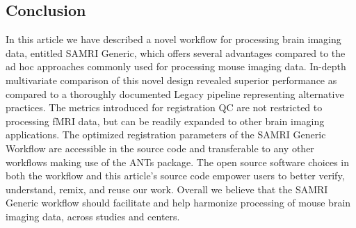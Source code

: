 \subsection{Conclusion}


In this article we have described a novel workflow for processing brain imaging data, entitled SAMRI Generic, which offers several advantages compared to the ad hoc approaches commonly used for processing mouse imaging data.
In-depth multivariate comparison of this novel design revealed superior performance as compared to a thoroughly documented Legacy pipeline representing alternative practices.
The metrics introduced for registration QC are not restricted to processing fMRI data, but can be readily expanded to other brain imaging applications.
The optimized registration parameters of the SAMRI Generic Workflow are accessible in the source code and transferable to any other workflows making use of the ANTs package.
The open source software choices in both the workflow and this article's source code empower users to better verify, understand, remix, and reuse our work.
Overall we believe that the SAMRI Generic workflow should facilitate and help harmonize processing of mouse brain imaging data, across studies and centers.
